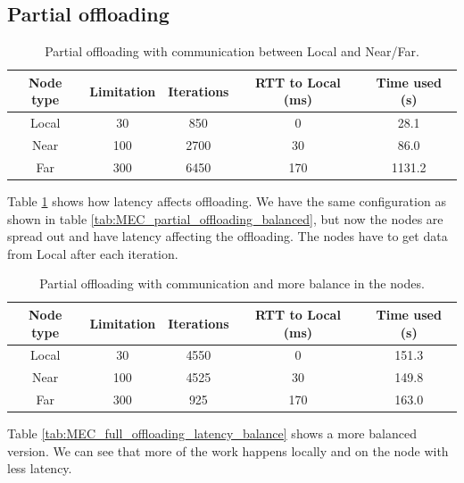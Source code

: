 \subsection{Partial offloading}







\begin{table}[h!]
    \centering
    \begin{tabular}[c]{|c|c|c|c|c|}
        \hline
        Node type & Limitation & Iterations & RTT to Local (ms)& Time used (s)\\
        \hline
        \hline
        Local & 30 & 850 & 0 & 28.1 \\
        \hline
        Near & 100 & 2700 & 30 & 86.0 \\
        \hline
        Far & 300 & 6450 & 170 & 1131.2 \\
        \hline
    \end{tabular}
    \caption{Partial offloading with communication between Local and Near/Far.}
    \label{tab:MEC_partial_offloading_latency}
\end{table}

Table \ref{tab:MEC_partial_offloading_latency} shows how latency affects offloading. We have the same configuration as shown in table \ref{tab:MEC_partial_offloading_balanced}, but now the nodes are spread out and have latency affecting the offloading. The nodes have to get data from Local after each iteration.

\begin{table}[h!]
    \centering
    \begin{tabular}[c]{|c|c|c|c|c|}
        \hline
        Node type & Limitation & Iterations & RTT to Local (ms)& Time used (s)\\
        \hline
        \hline
        Local & 30 & 4550 & 0 & 151.3  \\
        \hline
        Near & 100 & 4525 & 30 & 149.8 \\
        \hline
        Far & 300 & 925 & 170 & 163.0 \\
        \hline
    \end{tabular}
    \caption{Partial offloading with communication and more balance in the nodes.}
    \label{tab:MEC_partial_offloading_latency_balance}
\end{table}


Table \ref{tab:MEC_full_offloading_latency_balance} shows a more balanced version. We can see that more of the work happens locally and on the node with less latency.

